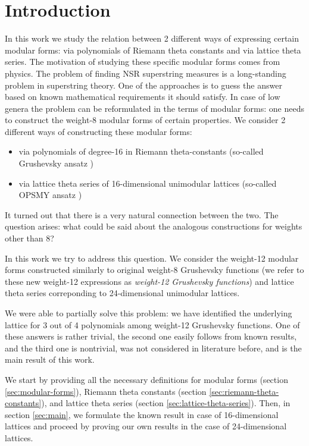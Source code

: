 \documentclass{article}
\theoremstyle{plain}
\theoremstyle{definition}
\begin{document}
\section{Introduction}
In this work we study the relation between 2 different ways of expressing certain modular forms:
via polynomials of Riemann theta constants and via lattice theta series.
The motivation of studying these specific modular forms comes from physics.
The problem of finding NSR superstring measures is a long-standing problem in superstring theory.
One of the approaches is to guess the answer based on known mathematical requirements
it should satisfy.
In case of low genera the problem can be reformulated in the terms of modular forms:
one needs to construct the weight-8 modular forms of certain properties.
We consider 2 different ways of constructing these modular forms:
\begin{itemize}
    \item via polynomials of degree-16 in Riemann theta-constants (so-called Grushevsky ansatz \cite{grushevsky})
    \item  via lattice theta series of 16-dimensional unimodular lattices (so-called OPSMY ansatz \cite{opsmy})
\end{itemize}
It turned out \cite{dunin-barkowski} that there is a very natural connection between the two.
The question arises: what could be said about the analogous constructions for weights other than 8?

In this work we try to address this question. We consider the weight-12 modular forms
constructed similarly to original weight-8 Grushevsky functions
(we refer to these new weight-12 expressions as \emph{weight-12 Grushevsky functions})
and lattice theta series correponding to 24-dimensional unimodular lattices.

We were able to partially solve this problem: we have identified the underlying lattice 
for 3 out of 4 polynomials among weight-12 Grushevsky functions.
One of these answers is rather trivial, the second one easily follows from known results,
and the third one is nontrivial, was not considered in literature before, and is 
the main result of this work.

We start by providing all the necessary definitions for 
modular forms (section \ref{sec:modular-forms}), 
Riemann theta constants (section \ref{sec:riemann-theta-constants}),
and lattice theta series (section \ref{sec:lattice-theta-series}).
Then, in section \ref{sec:main}, we formulate the known result in case of 16-dimensional lattices
and proceed by proving our own results in the case of 24-dimensional lattices.
\end{document}
